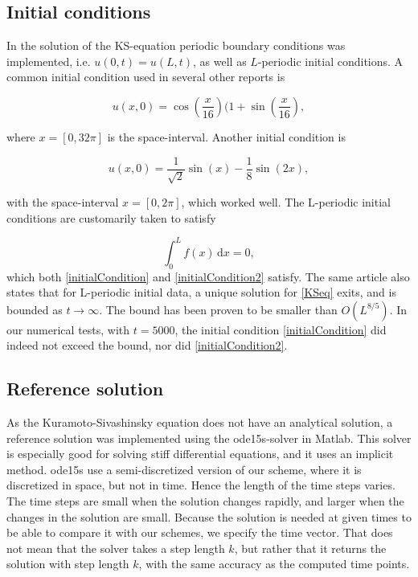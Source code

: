 \subsection{Initial conditions}
In the solution of the KS-equation periodic boundary conditions was implemented, i.e. $u(0,t) = u(L,t)$, as well as $L$-periodic initial conditions. A common initial condition used in several other reports is

\begin{equation}
\label{initialCondition}
u(x,0) = \cos(\frac{x}{16})(1 + \sin(\frac{x}{16}),
\end{equation}

where $x = [0, 32\pi]$ is the space-interval. Another initial condition is

\begin{equation}
\label{initialCondition2}
u(x,0) = \frac{1}{\sqrt{2}} \sin(x) - \frac{1}{8}\sin(2x),
\end{equation}

with the space-interval $x = [0, 2\pi]$, which worked well. The L-periodic initial conditions are customarily taken \cite{periodicInitial} to satisfy

\begin{equation}
\int_0^L\! f(x)\,\textrm{d}x = 0,
\end{equation} 
which both \eqref{initialCondition} and \eqref{initialCondition2} satisfy. The same article also states that for L-periodic initial data, a unique solution for \eqref{KSeq} exits, and is bounded as $t\rightarrow\infty$. The bound has been proven to be smaller than $O(L^{8/5})$. In our numerical tests, with $t=5000$, the initial condition \eqref{initialCondition} did indeed not exceed the bound, nor did \eqref{initialCondition2}.

\subsection{Reference solution}
As the Kuramoto-Sivashinsky equation does not have an analytical solution, a reference solution was implemented using the ode15s-solver in Matlab. This solver is especially good for solving stiff differential equations, and it uses an implicit method. ode15s use a semi-discretized version of our scheme, where it is discretized in space, but not in time. Hence the length of the time steps varies. The time steps are small when the solution changes rapidly, and larger when the changes in the solution are small. Because the solution is needed at given times to be able to compare it with our schemes, we specify the time vector. That does not mean that the solver takes a step length $k$, but rather that it returns the solution with step length $k$, with the same accuracy as the computed time points. \cite{ode15s}


